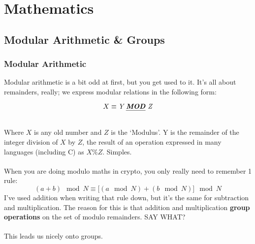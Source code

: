 
\chapter{Mathematics}
    \section{Modular Arithmetic \& Groups}
    \subsection{Modular Arithmetic}
    Modular arithmetic is a bit odd at first, but you get used to it. It's all about remainders, really; we express modular relations in the following form:\\
    \begin{figure}[htp!]
    \centering
        $$ X \equiv \textit{Y \emph{\textbf{MOD}} Z} $$
    \end{figure}\\
    Where $X$ is any old number and $Z$ is the `Modulus'. Y is the remainder of the integer division of $X$ by $Z$, the result of an operation expressed in many languages (including C) as $X \% Z$. Simples.\\
    \\
    When you are doing modulo maths in crypto, you only really need to remember 1 rule:
    $$(a+b) \mod N \equiv \big[(a \mod N) + (b \mod N)\big] \mod N$$
    I've used addition when writing that rule down, but it's the same for subtraction and multiplication. The reason for this is that addition and multiplication \textbf{group operations} on the set of modulo remainders. SAY WHAT?\\
    \\
    This leads us nicely onto groups.

